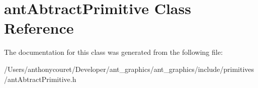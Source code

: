 \hypertarget{classant_abtract_primitive}{\section{ant\+Abtract\+Primitive Class Reference}
\label{classant_abtract_primitive}
}


The documentation for this class was generated from the following file\+:\begin{DoxyCompactItemize}
\item 
/\+Users/anthonycouret/\+Developer/ant\+\_\+graphics/ant\+\_\+graphics/include/primitives/ant\+Abtract\+Primitive.\+h\end{DoxyCompactItemize}
